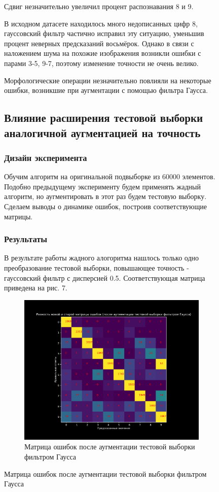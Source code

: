 \documentclass{article}
\begin{document}
\begin{figure}[H]
                Сдвиг незначительно увеличил процент распознавания 8 и 9.

                В исходном датасете находилось много недописанных цифр 8, гауссовский фильтр частично исправил эту ситуацию, уменьшив процент неверных предсказаний восьмёрок. Однако в связи с наложением шума на похожие изображения возникли ошибки с парами 3-5, 9-7, поэтому изменение точности не очень велико.

                Морфологические операции незначительно повлияли на некоторые ошибки, возникшие при аугментации с помощью фильтра Гаусса.

    \subsection{Влияние расширения тестовой выборки аналогичной аугментацией на точность}
        \subsubsection{Дизайн эксперимента}
            Обучим алгоритм на оригинальной подвыборке из 60000 элементов. Подобно предыдущему эксперименту будем применять жадный алгоритм, но аугментировать в этот раз будем тестовую выборку.
            Сделаем выводы о динамике ошибок, построив соответствующие матрицы.
        \subsubsection{Результаты}
            В результате работы жадного алогоритма нашлось только одно преобразование тестовой выборки, повышающее точность - гауссовский фильтр с дисперсией 0.5.
            Соответствующая матрица приведена на рис. 7.
            \begin{figure}[h]
                \centering
                \includegraphics[width=0.8\linewidth]{./pictures/ConfusionDifferenceBlur6.pdf}
                \caption{Матрица ошибок после аугментации тестовой выборки фильтром Гаусса}
                \label{fig:mpr}
            \end{figure}


\end{figure}
\end{document}
